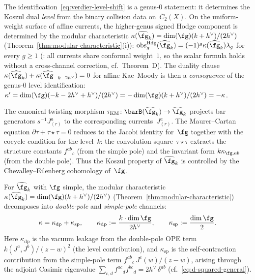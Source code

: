 \begin{remark}
\label{rem:level-shift-higher-genus}
The identification~\eqref{eq:verdier-level-shift} is a genus-$0$
statement: it determines the Koszul dual \emph{level} from the
binary collision data on~$\overline{C}_2(X)$. On the uniform-weight
surface of affine currents, the higher-genus signed Hodge component is
determined by the modular characteristic
$\kappa(\widehat{\fg}_k) = \dim(\fg)(k + h^\vee)/(2h^\vee)$
(Theorem~\ref{thm:modular-characteristic}(i)):
\(\operatorname{obs}^{\mathrm{Hdg}}_g(\widehat{\fg}_k)
=(-1)^g\kappa(\widehat{\fg}_k)\lambda_g\) for every $g \geq 1$
\textup{(}: all currents share conformal weight~$1$, so
the scalar formula holds without a cross-channel correction,
cf.\ Theorem~D\textup{)}.
The duality clause
\(\kappa(\widehat{\fg}_k)
 +\kappa(\widehat{\fg}_{-k-2h^\vee})=0\) for affine Kac--Moody is then a
\emph{consequence} of the genus-$0$ level identification:
$\kappa' = \dim(\fg)(-k - 2h^\vee + h^\vee)/(2h^\vee)
= -\dim(\fg)(k + h^\vee)/(2h^\vee) = -\kappa$.
\end{remark}

\begin{remark}
\label{rem:km-twisting-morphism}
The canonical twisting morphism
$\tau_{\mathrm{KM}} \colon \barB(\widehat{\fg}_k) \to \widehat{\fg}_k$
projects bar generators $s^{-1}J^a_{(r)}$ to the corresponding
currents~$J^a_{(r)}$. The Maurer--Cartan equation
$\partial\tau + \tau \star \tau = 0$ reduces to the Jacobi identity
for~$\fg$ together with the cocycle condition for the level~$k$:
the convolution square~$\tau \star \tau$ extracts the structure
constants $f^{ab}{}_c$ (from the simple pole) and the invariant
form $k\kappa_{\fg,ab}$ (from the double pole). Thus the Koszul
property of $\widehat{\fg}_k$ is controlled by the Chevalley--Eilenberg
cohomology of~$\fg$.
\end{remark}

\begin{definition}\label{def:channel-decomposition}
For $\widehat{\fg}_k$ with $\fg$ simple, the modular
characteristic $\kappa(\widehat{\fg}_k) =
\dim(\fg)(k + h^\vee)/(2h^\vee)$
(Theorem~\ref{thm:modular-characteristic}) decomposes into
\emph{double-pole} and \emph{simple-pole} channels:
\begin{equation}\label{eq:kappa-dp-sp}
\kappa = \kappa_{\mathrm{dp}} + \kappa_{\mathrm{sp}},
\qquad
\kappa_{\mathrm{dp}}
:= \frac{k \cdot \dim\fg}{2h^\vee},
\qquad
\kappa_{\mathrm{sp}}
:= \frac{\dim\fg}{2}.
\end{equation}
Here $\kappa_{\mathrm{dp}}$ is the vacuum leakage from the
double-pole OPE term $k(J^a, J^b)/(z-w)^2$ (the level
contribution), and $\kappa_{\mathrm{sp}}$ is the self-contraction
contribution from the simple-pole term
$f^{ab}{}_{c}\,J^c(w)/(z-w)$, arising through the adjoint
Casimir eigenvalue
$\sum_{c,d} f^{ac}{}_d f^{bc}{}_d = 2h^\vee\,\delta^{ab}$
(cf.~\eqref{eq:d-squared-general}).
\end{definition}

